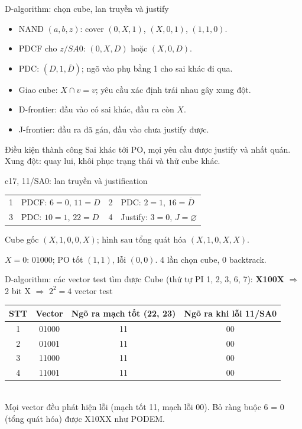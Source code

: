 \begin{frame}{D-algorithm: chọn cube, lan truyền và justify}
\begin{itemize}
\item NAND $(a,b,z)$: cover $(0,X,1)$, $(X,0,1)$, $(1,1,0)$.
\item PDCF cho $z/SA0$: $(0,X,D)$ hoặc $(X,0,D)$.
\item PDC: $(D,1,\overline D)$; ngõ vào phụ bằng 1 cho sai khác đi qua.
\item Giao cube: $X\cap v=v$; yêu cầu xác định trái nhau gây xung đột.
\item D-frontier: đầu vào có sai khác, đầu ra còn $X$.
\item J-frontier: đầu ra đã gán, đầu vào chưa justify được.
\end{itemize}
\begin{block}{Điều kiện thành công}
Sai khác tới PO, mọi yêu cầu được justify và nhất quán.\\
Xung đột: quay lui, khôi phục trạng thái và thử cube khác.
\end{block}
\end{frame}

\begin{frame}{c17, 11/SA0: lan truyền và justification}
\centering
\begingroup
\def\pTwoCSeventeenWidth{0.86\linewidth}

\endgroup
\par\smallskip
\small
\begin{tabular}{clcl}
1 & PDCF: $6=0$, $11=D$ & 2 & PDC: $2=1$, $16=\overline D$\\
3 & PDC: $10=1$, $22=D$ & 4 & Justify: $3=0$, $J=\varnothing$
\end{tabular}
\par\smallskip
Cube gốc $(X,1,0,0,X)$; hình sau tổng quát hóa $(X,1,0,X,X)$.
\par
\footnotesize $X=0$: $01000$; PO tốt $(1,1)$, lỗi $(0,0)$.
4 lần chọn cube, 0 backtrack.
\end{frame}

\begin{frame}{D-algorithm: các vector test tìm được}
\centering\small
Cube (thứ tự PI 1, 2, 3, 6, 7): \textbf{X100X} \(\Rightarrow\) 2 bit X \(\Rightarrow\) $2^2=4$ vector test\\[2mm]
\renewcommand{\arraystretch}{1.1}
\begin{tabular}{@{}cccc@{}}
\toprule
STT & Vector & Ngõ ra mạch tốt (22, 23) & Ngõ ra khi lỗi 11/SA0\\
\midrule
1 & 01000 & 11 & 00\\
2 & 01001 & 11 & 00\\
3 & 11000 & 11 & 00\\
4 & 11001 & 11 & 00\\
\bottomrule
\end{tabular}\\[2mm]
{\footnotesize Mọi vector đều phát hiện lỗi (mạch tốt 11, mạch lỗi 00). Bỏ ràng buộc 6 = 0 (tổng quát hóa) được X10XX như PODEM.}
\end{frame}
